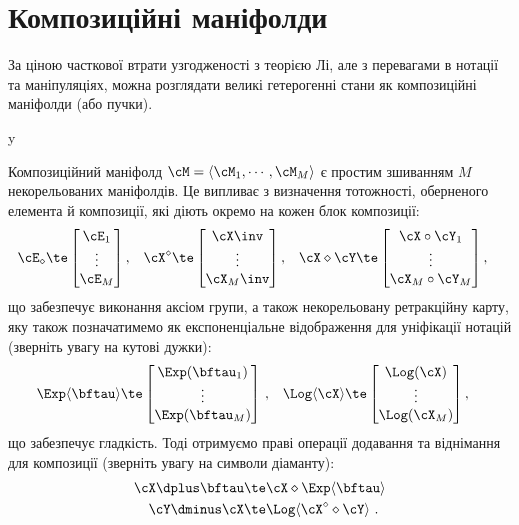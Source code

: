 
\section{Композиційні маніфолди}

За ціною часткової втрати узгодженості з теорією Лі, але з перевагами в нотації та маніпуляціях, можна розглядати великі гетерогенні стани як композиційні маніфолди (або пучки).


\if \examples y  \fi

Композиційний маніфолд $\cM=\langle\cM_1,\cdots,\cM_M\rangle$ є простим зшиванням $M$ некорельованих маніфолдів.
Це випливає з визначення тотожності, оберненого елемента й композиції, які діють окремо на кожен блок композиції:
%
\begin{align}
\cE_\diamond &\te \begin{bmatrix}
\cE_1 \\ \vdots \\ \cE_M
\end{bmatrix},
&
\cX^\diamond &\te \begin{bmatrix}
\cX\inv \\ \vdots \\ \cX_M\inv
\end{bmatrix},
&
\cX\diamond\cY &\te \begin{bmatrix}
\cX\circ\cY_1 \\
\vdots\\
\cX_M\circ\cY_M 
\end{bmatrix}
,
\end{align}
%
що забезпечує виконання аксіом групи, а також некорельовану ретракційну карту, яку також позначатимемо як експоненціальне відображення для уніфікації нотацій (зверніть увагу на кутові дужки):
%
\begin{align}\label{equ:exp_composite}
\Exp\langle\bftau\rangle &\te \begin{bmatrix}
\Exp(\bftau_1) \\ \vdots \\ \Exp(\bftau_M)
\end{bmatrix}
\,,
&
\Log\langle\cX\rangle &\te \begin{bmatrix}
\Log(\cX) \\ \vdots \\ \Log(\cX_M)
\end{bmatrix}
,
\end{align}
% 
що забезпечує гладкість.
Тоді отримуємо праві операції додавання та віднімання для композиції (зверніть увагу на символи діаманту):
%
\begin{align}
\cX\dplus\bftau &\te \cX\diamond\Exp\langle\bftau\rangle \\
\cY\dminus\cX &\te \Log\langle\cX^\diamond\diamond\cY\rangle
~.
\end{align}

